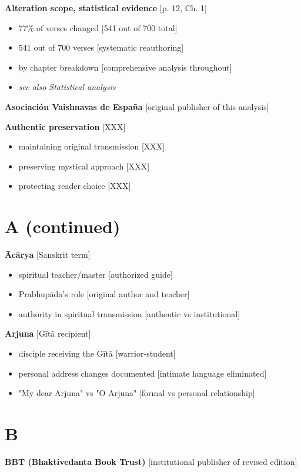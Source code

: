 \documentclass[11pt,twoside]{book}
\begin{document}
\textbf{\textbf{Alteration scope, statistical evidence}} {[}p. 12, Ch. 1]
\begin{itemize}
\item 77\% of verses changed [541 out of 700 total]
\item 541 out of 700 verses [systematic reauthoring]
\item by chapter breakdown [comprehensive analysis throughout]
\item \emph{see also Statistical analysis}
\end{itemize}

\textbf{\textbf{Asociación Vaishnavas de España}} {[}original publisher of this analysis]

\textbf{\textbf{Authentic preservation}} {[}XXX]
\begin{itemize}
\item maintaining original transmission [XXX]
\item preserving mystical approach [XXX]
\item protecting reader choice [XXX]
\end{itemize}
\section*{A (continued)}
\label{sec:org37cd809}

\textbf{\textbf{Ācārya}} {[}Sanskrit term]
\begin{itemize}
\item spiritual teacher/master [authorized guide]
\item Prabhupāda's role [original author and teacher]
\item authority in spiritual transmission [authentic vs institutional]
\end{itemize}

\textbf{\textbf{Arjuna}} {[}Gītā recipient]
\begin{itemize}
\item disciple receiving the Gītā [warrior-student]
\item personal address changes documented [intimate language eliminated]
\item "My dear Arjuna" vs "O Arjuna" [formal vs personal relationship]
\end{itemize}
\section*{B}
\label{sec:orgebb31e3}

\textbf{\textbf{BBT (Bhaktivedanta Book Trust)}} {[}institutional publisher of revised edition]
\end{document}
